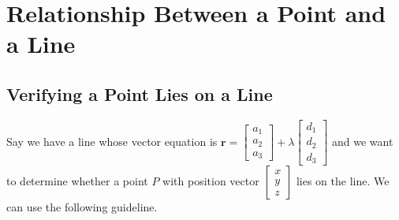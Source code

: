 \documentclass[11pt,a4paper]{book}
\begin{document}
\begin{example}
\begin{minipage}[t]{0.5\textwidth}
\begin{enumerate}[label=(\alph*),start=2]
\end{enumerate}

\end{minipage}

\end{example}

\section{Relationship Between a Point and a Line}

\subsection{Verifying a Point Lies on a Line}

Say we have a line whose vector equation is $\textbf{r}=\begin{bmatrix}a_{1}\\
a_{2}\\
a_{3}
\end{bmatrix}+\lambda\begin{bmatrix}d_{1}\\
d_{2}\\
d_{3}
\end{bmatrix}$ and we want to determine whether a point $P$ with position vector
$\begin{bmatrix}x\\
y\\
z
\end{bmatrix}$ lies on the line. We can use the following guideline.
\end{document}
